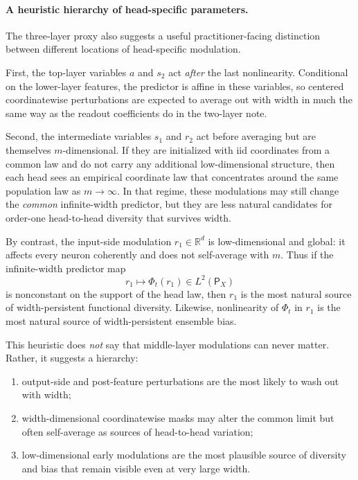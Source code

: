 \documentclass{article}
\theoremstyle{definition}
\newcommand{\R}{\mathbb{R}}
\begin{document}
\paragraph{A heuristic hierarchy of head-specific parameters.}
The three-layer proxy also suggests a useful practitioner-facing distinction
between different locations of head-specific modulation.

First, the top-layer variables $a$ and $s_2$ act \emph{after} the last
nonlinearity. Conditional on the lower-layer features, the predictor is affine
in these variables, so centered coordinatewise perturbations are expected to
average out with width in much the same way as the readout coefficients do in
the two-layer note.

Second, the intermediate variables $s_1$ and $r_2$ act before averaging but are
themselves $m$-dimensional. If they are initialized with iid coordinates from a
common law and do not carry any additional low-dimensional structure, then each
head sees an empirical coordinate law that concentrates around the same
population law as $m\to\infty$. In that regime, these modulations may still
change the \emph{common} infinite-width predictor, but they are less natural
candidates for order-one head-to-head diversity that survives width.

By contrast, the input-side modulation $r_1\in\R^d$ is low-dimensional and
global: it affects every neuron coherently and does not self-average with $m$.
Thus if the infinite-width predictor map
\[
  r_1 \mapsto \Phi_t(r_1)\in L^2(\mathsf P_X)
\]
is nonconstant on the support of the head law, then $r_1$ is the most natural
source of width-persistent functional diversity. Likewise, nonlinearity of
$\Phi_t$ in $r_1$ is the most natural source of width-persistent ensemble bias.

This heuristic does \emph{not} say that middle-layer modulations can never
matter. Rather, it suggests a hierarchy:
\begin{enumerate}[leftmargin=2em]
  \item output-side and post-feature perturbations are the most likely to wash
  out with width;
  \item width-dimensional coordinatewise masks may alter the common limit but
  often self-average as sources of head-to-head variation;
  \item low-dimensional early modulations are the most plausible source of
  diversity and bias that remain visible even at very large width.
\end{enumerate}
\end{document}
